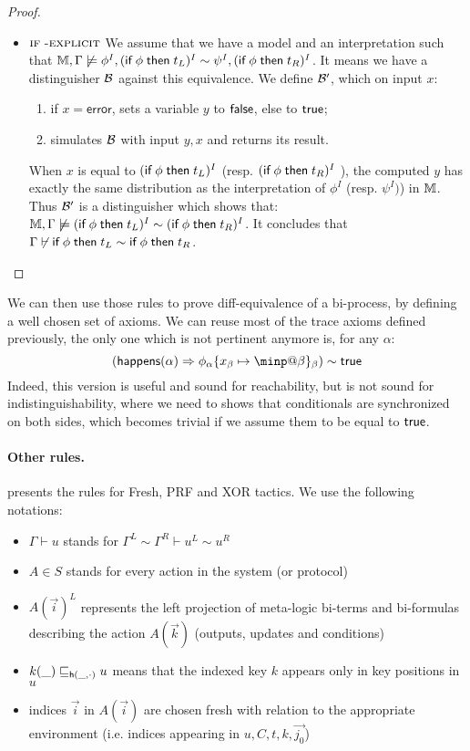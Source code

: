\begin{proof}
  \begin{itemize}
    \item $\textsc{\textsf{if}\;-explicit}$
      We assume that we have a model and an interpretation such that
      $\mathbb{M},\Gamma \not \models  \phi^I, (\textsf{if}\;  \phi \;\textsf{then}\; t_L)^I \sim \psi^I, (\textsf{if}\; \phi \;\textsf{then}\; t_R)^I $.
      It means we have a distinguisher $\mathcal{B}$ against this equivalence.
      We define $\mathcal{B}'$, which on input $x$:
      \begin{enumerate}
      \item if $x = \mathsf{error}$, sets a variable $y$ to $\textsf{false}$, else to $\textsf{true}$;
      \item simulates $\mathcal{B}$ with input $y,x$ and returns its result.
      \end{enumerate}
      When $x$ is equal to $(\textsf{if}\; \phi \;\textsf{then}\; t_L)^I $ (resp. $(\textsf{if}\; \phi \;\textsf{then}\; t_R)^I$ ), the computed $y$ has exactly the same distribution as the interpretation of $\phi^I$ (resp. $\psi^I)$) in $\mathbb{M}$.
      Thus $\mathcal{B}'$ is a distinguisher which shows that:
    $\mathbb{M},\Gamma \not \models (\textsf{if}\;  \phi \;\textsf{then}\; t_L)^I \sim  (\textsf{if}\; \phi \;\textsf{then}\; t_R)^I $.
      It concludes that $\Gamma \not \vdash \textsf{if}\;  \phi \;\textsf{then}\; t_L \sim \textsf{if}\;  \phi \;\textsf{then}\; t_R$.

    \end{itemize}
\end{proof}


We can then use those rules to prove diff-equivalence of a bi-process, by defining a well chosen set of axioms. We can reuse most of the trace axioms defined previously, the only one which is not pertinent anymore is, for any $\alpha$:
\[   (\happens(\alpha) \Rightarrow
  \phi_\alpha\{x_\beta\mapsto\minp@\beta\}_\beta) \sim \true\]
Indeed, this version is useful and sound for reachability, but is not sound for indistinguishability, where we need to shows that conditionals are synchronized on both sides, which becomes trivial if we assume them to be equal to $\textsf{true}$.

\paragraph{Other rules.}

 presents the rules for Fresh, PRF and XOR tactics.
We use the following notations:
\begin{itemize}
  \item $\Gamma \vdash u$ stands for $\Gamma^L \sim \Gamma^R \vdash u^L \sim u^R$
  \item $A \in S$ stands for every action in the system (or protocol)
  \item $A(\vec i)^L$ represents the left projection of meta-logic bi-terms and bi-formulas describing the action $A(\vec k)$ (outputs, updates and conditions)
  \item $k(\_) \sqsubseteq_{\mathsf{h}(\_,\cdot)} u$ means that the indexed key $k$ appears only in key positions in $u$
  \item indices $\vec i$ in $A(\vec i)$ are chosen fresh with relation to the appropriate environment (i.e. indices appearing in $u, C, t, k, \vec {j_0}$)
\end{itemize}

